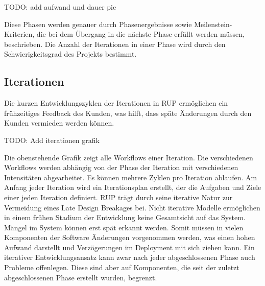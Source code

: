 	TODO: add aufwand und dauer pic
	
	Diese Phasen werden genauer durch Phasenergebnisse sowie Meilenstein-Kriterien, die bei dem Übergang in die nächste Phase erfüllt werden müssen, beschrieben.
Die Anzahl der Iterationen in einer Phase wird durch den Schwierigkeitsgrad des Projekts bestimmt. 

  \subsection{Iterationen}
  
  Die kurzen Entwicklungszyklen der Iterationen in RUP ermöglichen ein frühzeitiges Feedback des Kunden, was hilft, dass späte Änderungen durch den Kunden vermieden werden können. 
  
  TODO: Add iterationen grafik
  
  Die obenstehende Grafik zeigt alle Workflows einer Iteration. Die verschiedenen Workflows werden abhängig von der Phase der Iteration mit verschiedenen Intensitäten abgearbeitet. 
Es können mehrere Zyklen pro Iteration ablaufen.
Am Anfang jeder Iteration wird ein Iterationsplan erstellt, der die Aufgaben und Ziele einer jeden Iteration definiert. 
RUP trägt durch seine iterative Natur zur Vermeidung eines Late Design Breakages bei. Nicht iterative Modelle ermöglichen in einem frühen Stadium der Entwicklung keine Gesamtsicht auf das System. Mängel im System können erst spät erkannt werden. Somit müssen in vielen Komponenten der Software Änderungen vorgenommen werden, was einen hohen Aufwand darstellt und Verzögerungen im Deployment mit sich ziehen kann. 
Ein iterativer Entwicklungsansatz kann zwar nach jeder abgeschlossenen Phase auch Probleme offenlegen. Diese sind aber auf Komponenten, die seit der zuletzt abgeschlossenen Phase erstellt wurden, begrenzt.


